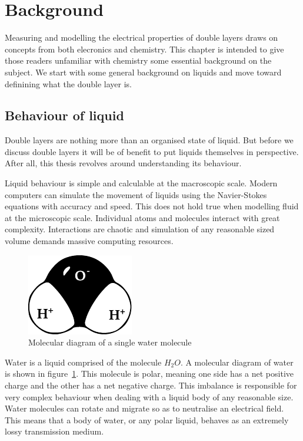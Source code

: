 
\section{Background}
  Measuring and modelling the electrical properties of double layers draws on concepts from both elecronics and chemistry.
  This chapter is intended to give those readers unfamiliar with chemistry some essential background on the subject.
  We start with some general background on liquids and move toward definining what the double layer is.

  \subsection{Behaviour of liquid}
    Double layers are nothing more than an organised state of liquid.
    But before we discuss double layers it will be of benefit to put liquids themselves in perspective.
    After all, this thesis revolves around understanding its behaviour.

    Liquid behaviour is simple and calculable at the macroscopic scale.
    Modern computers can simulate the movement of liquids using the Navier-Stokes equations with accuracy and speed.
    This does not hold true when modelling fluid at the microscopic scale.
    Individual atoms and molecules interact with great complexity.
    Interactions are chaotic and simulation of any reasonable sized volume demands massive computing resources.

    \begin{figure}
        \begin{center}
            \includegraphics{content/introduction/graphics/polarWater}
        \end{center}
        \caption{Molecular diagram of a single water molecule}
        \label{fig:waterMolecule}
    \end{figure}

    Water is a liquid comprised of the molecule $H_{2}O$.
    A molecular diagram of water is shown in figure~\ref{fig:waterMolecule}.
    This molecule is polar, meaning one side has a net positive charge and the other has a net negative charge.
    This imbalance is responsible for very complex behaviour when dealing with a liquid body of any reasonable size.
    Water molecules can rotate and migrate so as to neutralise an electrical field.
    This means that a body of water, or any polar liquid, behaves as an extremely lossy transmission medium.

